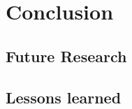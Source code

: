 \section{Conclusion}
\blindtext[1]

\subsection{Future Research}
\blindtext[1]

\subsection{Lessons learned}
\blindtext[1]